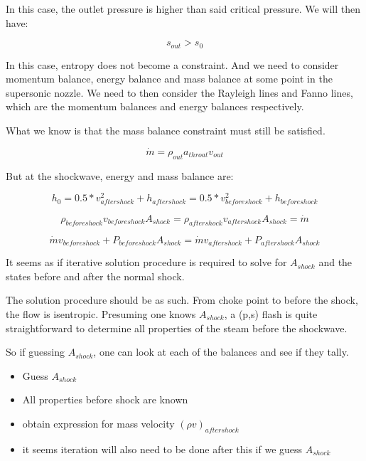 \documentclass[masters]{ucbthesis}
\renewcommand{\_}{\kern-1.5pt\textunderscore\kern-1.5pt}
\begin{document}
In this case, the outlet pressure is higher than said critical pressure.
We will then have:

\begin{equation*}
	s_{out} > s_0
\end{equation*}

In this case, entropy does not become a constraint. And we need to consider 
momentum balance, energy balance and mass balance at some point in the 
supersonic nozzle. We need to then consider the Rayleigh lines and 
Fanno lines, which are the momentum balances and energy balances 
respectively.

What we know is that the mass balance constraint must still be satisfied.

\begin{equation*}
	\dot{m} = \rho_{out} a_{throat} v_{out}
\end{equation*}

But at the shockwave, energy and mass balance are:

\begin{equation*}
	h_0 = 0.5 * v_{aftershock}^2 + h_{aftershock}
	= 0.5 * v_{beforeshock}^2 + h_{beforeshock}
\end{equation*}

\begin{equation*}
	\rho_{beforeshock} v_{beforeshock} A_{shock} = \rho_{aftershock} v_{aftershock} A_{shock} = \dot{m}
\end{equation*}


\begin{equation*}
	\dot{m} v_{beforeshock} + P_{beforeshock} A_{shock} = 
	\dot{m} v_{aftershock} + P_{aftershock} A_{shock}
\end{equation*}

It seems as if iterative solution procedure is required to solve for 
$A_{shock}$ and the states before and after the normal shock.

The solution procedure should be as such. From choke point to before 
the shock, the flow is isentropic. Presuming one knows $A_{shock}$, 
a (p,s) flash is quite straightforward to determine all properties 
of the steam before the shockwave.

So if guessing $A_{shock}$, one can look at each of the balances 
and see if they tally.

\begin{itemize}
	\item Guess $A_{shock}$
	\item All properties before shock are known
	\item obtain expression for mass velocity $(\rho v)_{aftershock}$
	\item it seems iteration will also need to be done after this if we guess $A_{shock}$
\end{itemize}
\end{document}
